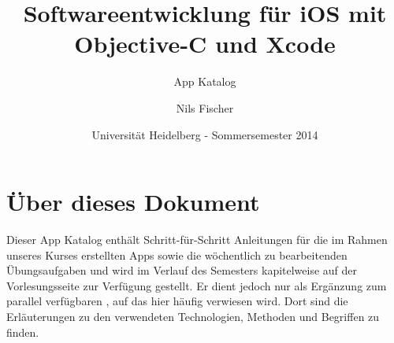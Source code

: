 \documentclass[parskip=half, final]{scrreprt}
\subtitle{App Katalog}
\title{Softwareentwicklung für iOS mit Objective-C und Xcode}
\author{Nils Fischer}
\date{Universität Heidelberg - Sommersemester 2014}
\begin{document}
\maketitle

\tableofcontents


\chapter{Über dieses Dokument}

Dieser App Katalog enthält Schritt-für-Schritt Anleitungen für die im Rahmen unseres Kurses erstellten Apps sowie die wöchentlich zu bearbeitenden Übungsaufgaben und wird im Verlauf des Semesters kapitelweise auf der Vorlesungsseite  zur Verfügung gestellt. Er dient jedoch nur als Ergänzung zum parallel verfügbaren , auf das hier häufig verwiesen wird. Dort sind die Erläuterungen zu den verwendeten Technologien, Methoden und Begriffen zu finden.
\end{document}

